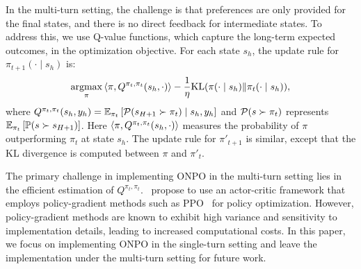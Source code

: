 In the multi-turn setting, the challenge is that preferences are only provided for the final states, and there is no direct feedback for intermediate states. To address this, we use Q-value functions, which capture the long-term expected outcomes, in the optimization objective. For each state $s_h$, the update rule for $\pi_{t+1}(\cdot \mid s_h)$ is:
\begin{align*}
\mathop{\mathrm{argmax}}_{\pi} \left\langle\pi,Q^{\pi_t,\pi_t}(s_h,\cdot)\right\rangle - \frac{1}{\eta}\mathrm{KL}(\pi(\cdot \mid s_h) \Vert \pi_t(\cdot \mid s_h)),
\end{align*}
where $Q^{\pi_t,\pi_t}(s_h,y_h)=\mathbb{E}_{\pi_t}\left[\mathcal P(s_{H+1} \succ \pi_t) \mid s_h,y_h\right]$ and  $\mathcal P(s \succ \pi_t)$ represents $\mathbb{E}_{\pi_t}\left[\mathbb{P}(s \succ s_{H+1})\right]$. Here $\left\langle\pi,Q^{\pi_t,\pi_t}(s_h,\cdot)\right\rangle$ measures the probability of $\pi$ outperforming $\pi_t$ at state $s_h$. The update rule for $\pi'_{t+1}$ is similar, except that the KL divergence is computed between $\pi$ and $\pi'_t$.


The primary challenge in implementing ONPO in the multi-turn setting lies in the efficient estimation of $Q^{\pi_t,\pi_t}$.~\citet{shani2024multi} propose to use an actor-critic framework that employs policy-gradient methods such as PPO~\citep{schulman2017proximal} for policy optimization. However, policy-gradient methods are known to exhibit high variance and sensitivity to implementation details, leading to increased computational costs. In this paper, we focus on implementing ONPO in the single-turn setting and leave the implementation under the multi-turn setting for future work.
